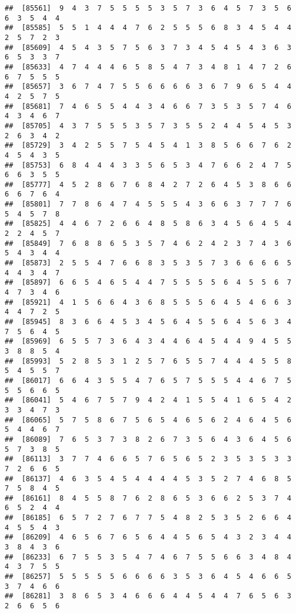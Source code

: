 \documentclass[
]{book}
\begin{document}
\begin{verbatim}
##  [85561]  9  4  3  7  5  5  5  5  3  5  7  3  6  4  5  7  3  5  6  6  3  5  4  4
##  [85585]  5  5  1  4  4  4  7  6  2  5  5  5  6  8  3  4  5  4  4  2  5  7  2  3
##  [85609]  4  5  4  3  5  7  5  6  3  7  3  4  5  4  5  4  3  6  3  6  5  3  3  7
##  [85633]  4  7  4  4  4  6  5  8  5  4  7  3  4  8  1  4  7  2  6  6  7  5  5  5
##  [85657]  3  6  7  4  7  5  5  6  6  6  6  3  6  7  9  6  5  4  4  4  2  5  7  5
##  [85681]  7  4  6  5  5  4  4  3  4  6  6  7  3  5  3  5  7  4  6  4  3  4  6  7
##  [85705]  4  3  7  5  5  5  3  5  7  3  5  5  2  4  4  5  4  5  3  2  6  3  4  2
##  [85729]  3  4  2  5  5  7  5  4  5  4  1  3  8  5  6  6  7  6  2  4  5  4  3  5
##  [85753]  6  8  4  4  4  3  3  5  6  5  3  4  7  6  6  2  4  7  5  6  6  3  5  5
##  [85777]  4  5  2  8  6  7  6  8  4  2  7  2  6  4  5  3  8  6  6  6  6  7  6  4
##  [85801]  7  7  8  6  4  7  4  5  5  5  4  3  6  6  3  7  7  7  6  5  4  5  7  8
##  [85825]  4  4  6  7  2  6  6  4  8  5  8  6  3  4  5  6  4  5  4  2  2  4  5  7
##  [85849]  7  6  8  8  6  5  3  5  7  4  6  2  4  2  3  7  4  3  6  5  4  3  4  4
##  [85873]  2  5  5  4  7  6  6  8  3  5  3  5  7  3  6  6  6  6  5  4  4  3  4  7
##  [85897]  6  6  5  4  6  5  4  4  7  5  5  5  5  6  4  5  5  6  7  4  7  3  4  6
##  [85921]  4  1  5  6  6  4  3  6  8  5  5  5  6  4  5  4  6  6  3  4  4  7  2  5
##  [85945]  8  3  6  6  4  5  3  4  5  6  4  5  5  6  4  5  6  3  4  7  5  6  4  5
##  [85969]  6  5  5  7  3  6  4  3  4  4  6  4  5  4  4  9  4  5  5  3  8  8  5  4
##  [85993]  5  2  8  5  3  1  2  5  7  6  5  5  7  4  4  4  5  5  8  5  4  5  5  7
##  [86017]  6  6  4  3  5  5  4  7  6  5  7  5  5  5  4  4  6  7  5  5  5  6  6  5
##  [86041]  5  4  6  7  5  7  9  4  2  4  1  5  5  4  1  6  5  4  2  3  3  4  7  3
##  [86065]  5  7  5  8  6  7  5  6  5  4  6  5  6  2  4  6  4  5  6  5  4  4  6  7
##  [86089]  7  6  5  3  7  3  8  2  6  7  3  5  6  4  3  6  4  5  6  5  7  3  8  5
##  [86113]  3  7  7  4  6  6  5  7  6  5  6  5  2  3  5  3  5  3  3  7  2  6  6  5
##  [86137]  4  6  3  5  4  5  4  4  4  4  5  3  5  2  7  4  6  8  5  7  5  8  4  5
##  [86161]  8  4  5  5  8  7  6  2  8  6  5  3  6  6  2  5  3  7  4  6  5  2  4  4
##  [86185]  6  5  7  2  7  6  7  7  5  4  8  2  5  3  5  2  6  6  4  4  5  5  4  3
##  [86209]  4  6  5  6  7  6  5  6  4  4  5  6  5  4  3  2  3  4  4  3  8  4  3  6
##  [86233]  6  7  5  5  3  5  4  7  4  6  7  5  5  6  6  3  4  8  4  4  3  7  5  5
##  [86257]  5  5  5  5  5  6  6  6  6  3  5  3  6  4  5  4  6  6  5  3  7  4  6  6
##  [86281]  3  8  6  5  3  4  6  6  6  4  4  5  4  4  7  6  5  6  3  2  6  6  5  6

\end{verbatim}
\end{document}
